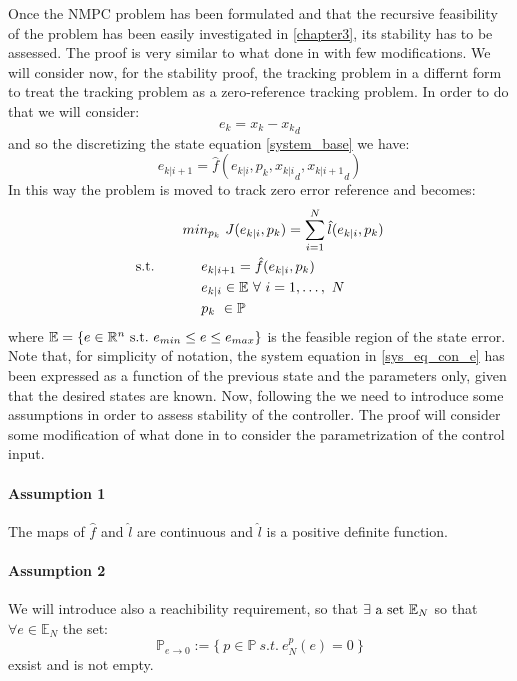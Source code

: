 Once the NMPC problem has been formulated and that the recursive feasibility of the problem has been easily investigated in \ref{chapter3}, its stability has to be assessed. 
The proof is very similar to what done in \cite{alamir2018stability} with few modifications. We will consider now, for the stability proof, the tracking problem in a differnt form to treat the tracking problem as a zero-reference tracking problem. In order to do that we will consider:
\begin{equation*}
    e_k=x_k-{x_k}_d
\end{equation*}
and so the discretizing the state equation \ref{system_base} we have:
\begin{equation}\label{sys_eq_con_e}
    e_{k|i+1}=\hat{f}(e_{k|i},p_k,{x_{k|i}}_d,{x_{k|i+1}}_d)
\end{equation}
In this way the problem is moved to track zero error reference and becomes: 
\begin{equation} \label{ourproblem_stab}
\begin{split}
		& min_{{p}_k}\ J({e}_{k|i},{p}_k) =\sum_{i=1}^{N}\hat{l}(e_{k|i},{p}_{k}) \\
		\textnormal{s.t.}\qquad
		&\ \ \ \ e_{k|i+1}=\hat{f}(e_{k|i},p_k) \\
		&\ \ \ \ e_{k|i} \in \mathbb{E}\ \forall\ i=1,\dots,\ N  \\
		&\ \ \ \ {p}_k\   \in \mathbb{P}\ \\
	\end{split}	
\end{equation}
where $\mathbb{E} = \lbrace {e}\in \mathbb{R}^n\ \textnormal{s.t.}\ {e}_{min}\leq e\leq e_{max} \rbrace$ is the feasible region of the state error. Note that, for simplicity of notation, the system equation in \ref{sys_eq_con_e} has been expressed as a function of the previous state and the parameters only, given that the desired states are known.
Now, following the \cite{alamir2018stability} we need to introduce some assumptions in order to assess stability of the controller. The proof will consider some modification of what done in \cite{alamir2018stability} to consider the parametrization of the control input. 


\paragraph{Assumption 1} The maps of $\hat{f}$ and $\hat{l}$ are continuous and $\hat{l}$ is a positive definite function. 

\paragraph{Assumption 2} We will introduce also a reachibility requirement, so that $\exists \textnormal{ a set } \mathbb{E}_N$ so that $\forall e \in \mathbb{E}_N $ the set:
\begin{equation*}
	\mathbb{P}_{e \to 0}:=\lbrace \ p \in \mathbb{P}\ s.t.\ e_N^p(e)=0\ \rbrace
\end{equation*} exsist and is not empty.

